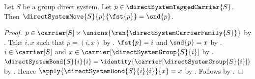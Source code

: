 \begin{proposition}\label{direct_system_move_identity}
    Let $S$ be a group direct system.
    Let $p\in\directSystemTaggedCarrier{S}$.
    Then $\directSystemMove{S}{p}{\fst{p}}=\snd{p}$.
\end{proposition}
\begin{proof}
    $p\in\carrier[S]\times\unions{\ran{\directSystemCarrierFamily{S}}}$ by
        .
    Take $i,x$ such that $p=(i,x)$ by .
    $\fst{p}=i$ and $\snd{p}=x$ by
        .
    $i\in\carrier[S]$ and
        $x\in\carrier[\directSystemGroup{S}{i}]$ by
        .
    $\directSystemBond{S}{i}{i}
        =\identity{\carrier[\directSystemGroup{S}{i}]}$ by
        .
    Hence $\apply{\directSystemBond{S}{i}{i}}{x}=x$ by
        .
    Follows by .
\end{proof}

